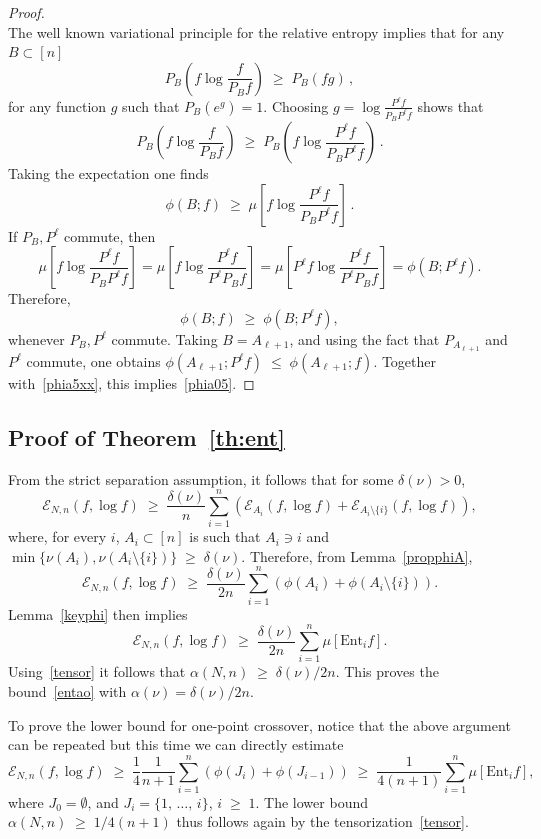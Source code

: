 \documentclass[10pt,a4paper]{amsart}
\renewcommand{\leq}{\;\leqslant\;}
\renewcommand{\geq}{\;\geqslant\;}
\newcommand{\ent}{\mathrm{Ent}}
\newcommand{\cE}{\mathcal{E}}
\let\a=\alpha
\let\d=\delta
\theoremstyle{definition}
\theoremstyle{plain}
\numberwithin{equation}{section}
\begin{document}
\begin{proof}
\begin{equation}
\end{equation}
The well known variational principle for the relative entropy implies that for any $B\subset [n]$
\[
P_B\left(f\log\frac{f}{P_Bf}\right)\geq P_B(fg)\,,
\]
for any function $g$ such that $P_B(e^g)=1$. Choosing $g= \log\frac{P^\ell f}{P_BP^\ell f}$ shows that
\[
P_B\left(f\log\frac{f}{P_Bf}\right)\geq P_B\left(f\log\frac{P^\ell f}{P_BP^\ell f}\right)\,.
\]
Taking the expectation one finds
\[
\phi(B;f)\geq\mu\left[f\log\frac{P^\ell f}{P_BP^\ell f}
\right]\,.
\]
If $P_B,P^\ell $ commute, then
\[
\mu\left[f\log\frac{P^\ell f}{P_BP^\ell f}
\right]= \mu\left[f\log\frac{P^\ell f}{P^\ell P_Bf}
\right]=\mu\left[P^\ell f\log\frac{P^\ell f}{P^\ell P_Bf}
\right] = \phi\left(B;P^\ell f\right).
\]
Therefore,
\[
\phi(B;f)\geq\phi\left(B;P^\ell f\right),
\]
whenever $P_B,P^\ell $ commute. Taking $B=A_{\ell+1}$, and using the fact that $P_{A_{\ell+1}}$ and $P^{\ell}$ commute, one obtains $\phi\left(A_{\ell+1};P^\ell f\right)\leq \phi\left(A_{\ell+1}; f\right)$. Together with~\eqref{phia5xx}, this implies~\eqref{phia05}.
\end{proof}

\subsection{Proof of Theorem~\ref{th:ent}}

From the strict separation assumption, it follows that for some $\d(\nu)>0$,
\[
\cE_{N,n}(f,\log f)
\geq \frac{\d(\nu)}n\sum_{i=1}^n\left(\cE_{A_i}(f,\log f)+\cE_{A_i\setminus\{i\}}(f,\log f)\right),
\]
where, for every $i$, $A_i\subset[n]$ is such that $A_i\ni i$ and $\min\{\nu(A_i),\nu(A_i\setminus\{i\})\}\geq \d(\nu)$. Therefore, from Lemma~\ref{propphiA},
\begin{equation}\label{phia5a1}
\cE_{N,n}(f,\log f)
\geq \frac{\d(\nu)}{2n}\sum_{i=1}^n\left(\phi(A_i) +\phi(A_i\setminus\{i\})\right).
\end{equation}
Lemma~\ref{keyphi} then implies
\begin{equation}\label{phia5a2}
\cE_{N,n}(f,\log f)
\geq \frac{\d(\nu)}{2n}\sum_{i=1}^n\mu\left[\ent_i f\right].
\end{equation}
Using~\eqref{tensor} it follows that $\a(N,n)\geq \d(\nu)/{2n}$. This proves the bound~\eqref{entao} with $\a(\nu)=\d(\nu)/{2n}$.

To prove the lower bound for one-point crossover, notice that the above argument can be repeated but this time we can directly estimate
\[
\cE_{N,n}(f,\log f)\geq \frac14\frac1{n+1}\sum_{i=1}^n (\phi(J_i)+\phi(J_{i-1}))\geq
\frac1{4(n+1)}\sum_{i=1}^n\mu\left[\ent_{i}f \right],
\]
where $J_0=\emptyset$, and $J_i=\{1,\,\dots,\,i\}$, $i\geq 1$. The lower bound $\a(N,n)\geq 1/4(n+1)$ thus follows again by the tensorization~\eqref{tensor}.
\end{document}
